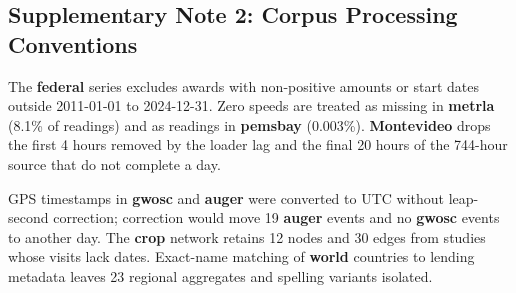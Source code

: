 \documentclass{article}
\begin{document}
\clearpage
\subsection*{Supplementary Note 2: Corpus Processing Conventions}
\label{sec:si-note-processing}
The \textbf{federal} series excludes awards with non-positive amounts or start dates outside 2011-01-01 to 2024-12-31. Zero speeds are treated as missing in \textbf{metrla} (8.1\% of readings) and as readings in \textbf{pemsbay} (0.003\%). \textbf{Montevideo} drops the first 4 hours removed by the loader lag and the final 20 hours of the 744-hour source that do not complete a day.

GPS timestamps in \textbf{gwosc} and \textbf{auger} were converted to UTC without leap-second correction; correction would move 19 \textbf{auger} events and no \textbf{gwosc} events to another day. The \textbf{crop} network retains 12 nodes and 30 edges from studies whose visits lack dates. Exact-name matching of \textbf{world} countries to lending metadata leaves 23 regional aggregates and spelling variants isolated.

\clearpage
\end{document}
